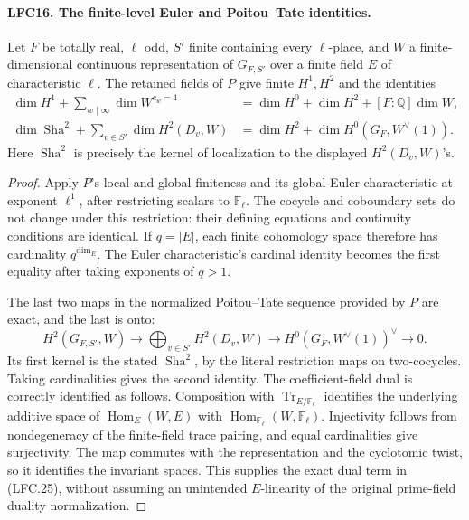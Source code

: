 \documentclass[11pt,a4paper]{article}
\numberwithin{equation}{section}
\theoremstyle{remark}\newtheorem{remark}[theorem]{Remark}
\begin{document}
\paragraph{LFC16. The finite-level Euler and Poitou--Tate identities.}
\label{claim:LFC16}
Let \(F\) be totally real, \(\ell\) odd,
\(S'\) finite containing every \(\ell\)-place, and \(W\)
a finite-dimensional continuous representation of
\(G_{F,S'}\) over a finite field \(E\) of characteristic
\(\ell\).  The retained fields of \(P\) give finite
\(H^1,H^2\) and the identities
\[
 \begin{split}
 \dim H^1+\sum_{w\mid\infty}\dim W^{c_w=1}
   &=\dim H^0+\dim H^2+[F:\mathbb Q]\dim W,\\
 \dim\operatorname{Sha}^2+\sum_{v\in S'}\dim H^2(D_v,W)
   &=\dim H^2+\dim H^0(G_F,W^\vee(1)).
 \end{split}                                           \tag{LFC.25}
\]
Here \(\operatorname{Sha}^2\) is precisely the kernel of localization
to the displayed \(H^2(D_v,W)\)'s.

\begin{proof}
Apply \(P\)'s local and global finiteness and its global
Euler characteristic at exponent \(\ell^1\), after
restricting scalars to \(\mathbb F_\ell\).
The cocycle and coboundary sets do not change under this
restriction: their defining equations and continuity
conditions are identical.  If \(q=|E|\), each finite
cohomology space therefore has cardinality \(q^{\dim_E}\).
The Euler characteristic's cardinal identity becomes
the first equality after taking exponents of \(q>1\).

The last two maps in the normalized Poitou--Tate sequence
provided by \(P\) are exact, and the last is onto:
\[
 H^2(G_{F,S'},W)\longrightarrow
 \bigoplus_{v\in S'}H^2(D_v,W)
       \longrightarrow H^0(G_F,W^\vee(1))^\vee
       \longrightarrow0.
 \]
Its first kernel is the stated \(\operatorname{Sha}^2\), by the
literal restriction maps on two-cocycles.
Taking cardinalities gives the second identity.
The coefficient-field dual is correctly identified as
follows.  Composition with
\(\operatorname{Tr}_{E/\mathbb F_\ell}\) identifies the
underlying additive space of \(\operatorname{Hom}_E(W,E)\)
with \(\operatorname{Hom}_{\mathbb F_\ell}(W,\mathbb F_\ell)\).
Injectivity follows from nondegeneracy of the finite-field
trace pairing, and equal cardinalities give surjectivity.
The map commutes with the representation and the
cyclotomic twist, so it identifies the invariant spaces.
This supplies the exact dual term in (LFC.25), without
assuming an unintended \(E\)-linearity of the original
prime-field duality normalization.
\end{proof}
\end{document}
